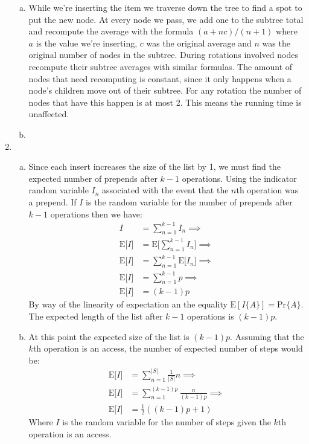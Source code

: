\documentclass[letterpaper,10pt]{article}
\begin{document}
\begin{enumerate}
\begin{enumerate}[a)]
		\item While we're inserting the item we traverse down the tree to find a spot to put the new node. At every node we pass, we add one to the subtree total and recompute the average with the formula $(a + nc)/(n+1)$ where $a$ is the value we're inserting, $c$ was the original average and $n$ was the original number of nodes in the subtree. During rotations involved nodes recompute their subtree averages with similar formulas. The amount of nodes that need recomputing is constant, since it only happens when a node's children move out of their subtree. For any rotation the number of nodes that have this happen is at most 2. This means the running time is unaffected.

		\item
	\end{enumerate}
	\clearpage

	\item

	\begin{enumerate}[a)]
		\item Since each insert increases the size of the list by 1, we must find the expected number of prepends after $k-1$ operations. Using the indicator random variable $I_{n}$ associated with the event that the $n$th operation was a prepend. If $I$ is the random variable for the number of prepends after $k-1$ operations then we have:
		\begin{align*}
			I & = \sum^{k-1}_{n=1} I_n \implies \\
			\text{E}\big[I\big] & = \text{E}\Bigg[ \sum^{k-1}_{n=1} I_n \Bigg] \implies \\
			\text{E}\big[I\big] & = \sum^{k-1}_{n=1} \text{E}\big[ I_n \big] \implies \\
			\text{E}\big[I\big] & = \sum^{k-1}_{n=1} p \implies \\
			\text{E}\big[I\big] & =  (k-1)p
		\end{align*}
		By way of the linearity of expectation an the equality $\text{E}[I\{A\}] = \text{Pr}\{A\}$.
		The expected length of the list after $k-1$ operations is $(k-1)p$.
		\item At this point the expected size of the list is $(k-1)p$. Assuming that the $k$th operation is an access, the number of expected number of steps would be:
		\begin{align*}
			\text{E}\big[I\big] & = \sum^{|S|}_{n=1} \frac{1}{|S|} n \implies \\
			\text{E}\big[I\big] & = \sum^{(k-1)p}_{n=1} \frac{n}{(k-1)p} \implies \\
			\text{E}\big[I\big] & = \frac{1}{2} ((k-1)p + 1)
		\end{align*}
		Where $I$ is the random variable for the number of steps given the $k$th operation is an access.


\end{enumerate}
\end{enumerate}
\end{document}
